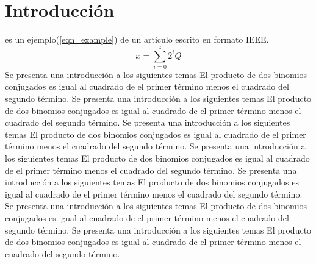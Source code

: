 \documentclass[journal]{IEEEtran}
\begin{document}
%
\IEEEpeerreviewmaketitle



\section{Introducción}
% 
% 
% 
% 
 es un ejemplo(\ref{eqn_example}) de un articulo escrito en formato IEEE.
\begin{equation}
\label{eqn_example}
x = \sum\limits_{i=0}^{z} 2^{i}Q
\end{equation}
Se presenta una introducción a los siguientes temas El producto de dos binomios conjugados es igual al cuadrado de el primer término menos el cuadrado del segundo término.
Se presenta una introducción a los siguientes temas El producto de dos binomios conjugados es igual al cuadrado de el primer término menos el cuadrado del segundo término.
Se presenta una introducción a los siguientes temas El producto de dos binomios conjugados es igual al cuadrado de el primer término menos el cuadrado del segundo término.
Se presenta una introducción a los siguientes temas El producto de dos binomios conjugados es igual al cuadrado de el primer término menos el cuadrado del segundo término.
Se presenta una introducción a los siguientes temas El producto de dos binomios conjugados es igual al cuadrado de el primer término menos el cuadrado del segundo término.
Se presenta una introducción a los siguientes temas El producto de dos binomios conjugados es igual al cuadrado de el primer término menos el cuadrado del segundo término.
Se presenta una introducción a los siguientes temas El producto de dos binomios conjugados es igual al cuadrado de el primer término menos el cuadrado del segundo término.
\end{document}

